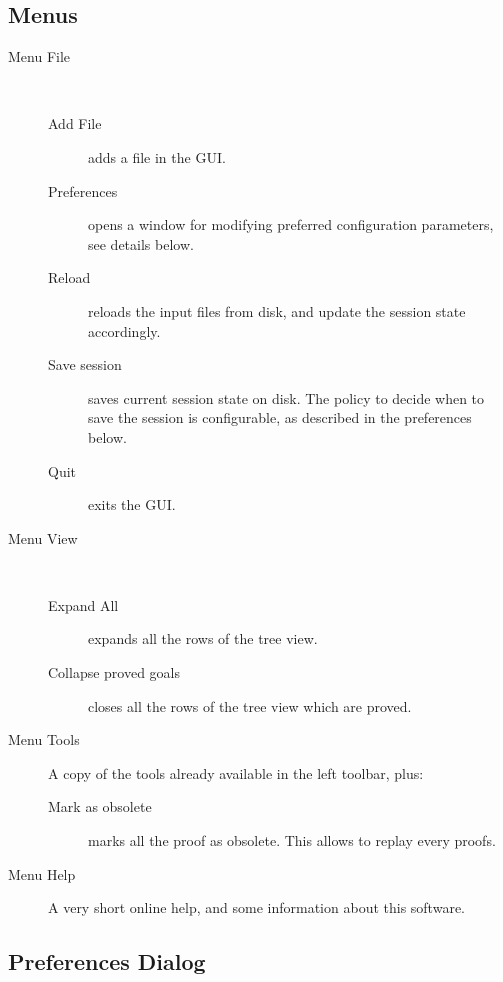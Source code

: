 \subsection{Menus}

\begin{description}
\item[Menu \textsf{File}]~
\begin{description}
\item[Add File] adds a file in the GUI.
\item[Preferences] opens a window for modifying preferred
  configuration parameters, see details below.
\item[Reload] reloads the input files from disk, and update the session state accordingly.
\item[Save session] saves current session state on disk. The policy to decide when to save the session is configurable, as described in the preferences below.
\item[Quit] exits the GUI.
\end{description}

\item[Menu \textsf{View}]~
\begin{description}
\item[Expand All] expands all the rows of the tree view.
\item[Collapse proved goals] closes all the rows of the tree view
  which are proved.
\end{description}

\item[Menu \textsf{Tools}]
A copy of the tools already available in the left toolbar, plus:
\begin{description}
\item[Mark as obsolete] marks all the proof as
  obsolete.
  This allows to replay every proofs.
\end{description}

\item[Menu \textsf{Help}]
A very short online help, and some information about this software.
\end{description}

\subsection{Preferences Dialog}

